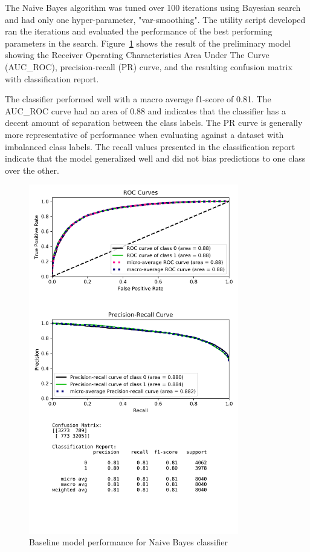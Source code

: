 \documentclass[journal,twoside,web]{ieeecolor}
\begin{document}
The Naive Bayes algorithm was tuned over 100 iterations using Bayesian search and had only one hyper-parameter, "var-smoothing". The utility script developed ran the iterations and evaluated the performance of the best performing parameters in the search. Figure~\ref{fig:prelim-NB} shows the result of the preliminary model showing the Receiver Operating Characteristics Area Under The Curve (AUC\_ROC), precision-recall (PR) curve, and the resulting confusion matrix with classification report. 

The classifier performed well with a macro average f1-score of 0.81. The AUC\_ROC curve had an area of 0.88 and indicates that the classifier has a decent amount of separation between the class labels. The PR curve is generally more representative of performance when evaluating against a dataset with imbalanced class labels. The recall values presented in the classification report indicate that the model generalized well and did not bias predictions to one class over the other.

\begin{figure}[h!]
  \centering
  \includegraphics[width=3.6in]{project/code/preliminary-naivebayes-downsampled.png}
  \caption{Baseline model performance for Naive Bayes classifier}
  \label{fig:prelim-NB}
\end{figure}
\end{document}
